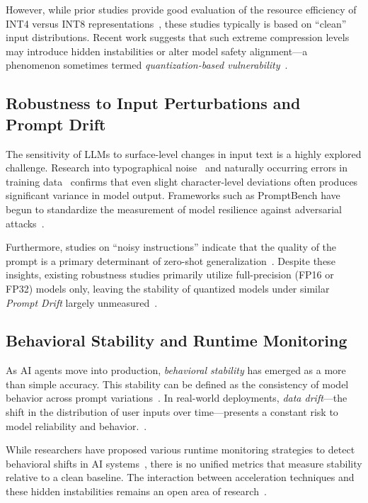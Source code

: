 \documentclass[conference]{IEEEtran}
\begin{document}
However, while prior studies provide good evaluation of the resource efficiency of INT4 versus INT8 representations~\cite{ref14, ref18}, these studies typically is based on ``clean'' input distributions. Recent work suggests that such extreme compression levels may introduce hidden instabilities or alter model safety alignment—a phenomenon sometimes termed \textit{quantization-based vulnerability}~\cite{ref10, ref13}.

\subsection{Robustness to Input Perturbations and Prompt Drift}

The sensitivity of LLMs to surface-level changes in input text is a highly explored challenge. Research into typographical noise~\cite{ref12} and naturally occurring errors in training data~\cite{ref9} confirms that even slight character-level deviations often produces significant variance in model output. Frameworks such as PromptBench have begun to standardize the measurement of model resilience against adversarial attacks~\cite{ref5, ref21}. 

Furthermore, studies on ``noisy instructions'' indicate that the quality of the prompt is a primary determinant of zero-shot generalization~\cite{ref11}. Despite these insights, existing robustness studies primarily utilize full-precision (FP16 or FP32) models only, leaving the stability of quantized models under similar \textit{Prompt Drift} largely unmeasured~\cite{ref4}.

\subsection{Behavioral Stability and Runtime Monitoring}

As AI agents move into production, \textit{behavioral stability} has emerged as a more than simple accuracy. This stability can be defined as the consistency of model behavior across prompt variations~\cite{ref6}. In real-world deployments, \textit{data drift}—the shift in the distribution of user inputs over time—presents a constant risk to model reliability and behavior.~\cite{ref7}. 

While researchers have proposed various runtime monitoring strategies to detect behavioral shifts in AI systems~\cite{ref20}, there is no unified metrics that measure stability relative to a clean baseline. The interaction between acceleration techniques and these hidden instabilities remains an open area of research~\cite{ref13}.
\end{document}
